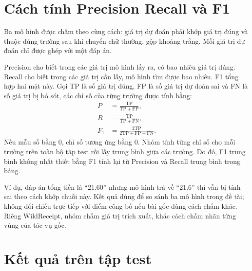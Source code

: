 \section{Cách tính Precision Recall và F1}


Ba mô hình được chấm theo cùng cách: giá trị dự đoán phải khớp giá trị đúng và thuộc đúng trường sau khi chuyển chữ thường, gộp khoảng trắng. Mỗi giá trị dự đoán chỉ được ghép với một đáp án.

Precision cho biết trong các giá trị mô hình lấy ra, có bao nhiêu giá trị đúng. Recall cho biết trong các giá trị cần lấy, mô hình tìm được bao nhiêu. F1 tổng hợp hai mặt này. Gọi TP là số giá trị đúng, FP là số giá trị dự đoán sai và FN là số giá trị bị bỏ sót, các chỉ số của từng trường được tính bằng:
\begingroup
\setlength{\jot}{14pt}
\begin{align}
P &= \frac{\mathrm{TP}}{\mathrm{TP}+\mathrm{FP}}, \\
R &= \frac{\mathrm{TP}}{\mathrm{TP}+\mathrm{FN}}, \\
F_1 &= \frac{2\mathrm{TP}}{2\mathrm{TP}+\mathrm{FP}+\mathrm{FN}}.
\end{align}
\endgroup
Nếu mẫu số bằng 0, chỉ số tương ứng bằng 0. Nhóm tính từng chỉ số cho mỗi trường trên toàn bộ tập test rồi lấy trung bình giữa các trường. Do đó, F1 trung bình không nhất thiết bằng F1 tính lại từ Precision và Recall trung bình trong bảng.

Ví dụ, đáp án tổng tiền là ``21.60'' nhưng mô hình trả về ``21.6'' thì vẫn bị tính sai theo cách khớp chuỗi này. Kết quả dùng để so sánh ba mô hình trong đề tài; không đối chiếu trực tiếp với điểm công bố nếu bài gốc dùng cách chấm khác. Riêng WildReceipt, nhóm chấm giá trị trích xuất, khác cách chấm nhãn từng vùng của tác vụ gốc.

\section{Kết quả trên tập test}

